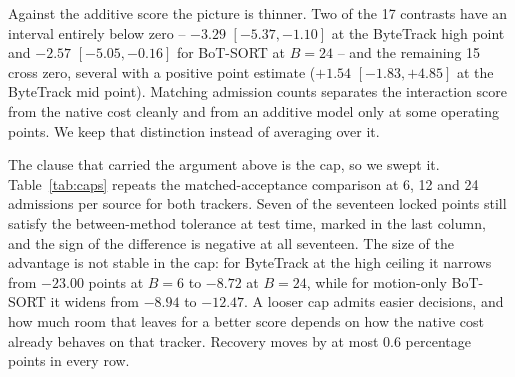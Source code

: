 Against the additive score the picture is thinner. Two of the 17 contrasts
have an interval entirely below zero -- $-3.29$ $[-5.37,-1.10]$ at the
ByteTrack high point and $-2.57$ $[-5.05,-0.16]$ for BoT-SORT at $B=24$ --
and the remaining 15 cross zero, several with a positive point estimate
($+1.54$ $[-1.83,+4.85]$ at the ByteTrack mid point). Matching admission
counts separates the interaction score from the native cost cleanly and
from an additive model only at some operating points. We keep that
distinction instead of averaging over it.

The clause that carried the argument above is the cap, so we swept it.
Table~\ref{tab:caps} repeats the matched-acceptance comparison at 6, 12 and
24 admissions per source for both trackers. Seven of the seventeen locked
points still satisfy the between-method tolerance at test time, marked in
the last column, and the sign of the difference is negative at all
seventeen. The size of the advantage is not stable in the cap: for
ByteTrack at the high ceiling it narrows from $-23.00$ points at $B=6$ to
$-8.72$ at $B=24$, while for motion-only BoT-SORT it widens from $-8.94$ to
$-12.47$. A looser cap admits easier decisions, and how much room that
leaves for a better score depends on how the native cost already behaves
on that tracker. Recovery moves by at most 0.6 percentage points in every
row.

